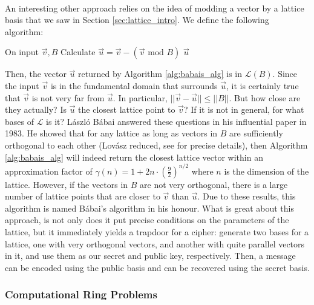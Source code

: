 \documentclass{article}
\theoremstyle{definition}
\theoremstyle{example}
\renewcommand{\L}{\mathcal{L}}
\renewcommand{\mod}{\,\,\text{mod}\,\,}
\newcommand{\norm}[1]{||#1||}
\begin{document}
\paragraph{} An interesting other approach relies on the idea of modding a
vector by a lattice basis that we saw in Section \ref{sec:lattice_intro}. We define the
following algorithm:
\begin{algorithm}[H]
  \caption{}
  \label{alg:babais_alg}
  \begin{algorithmic}
    \State On input $\vec{v}, B$
    \State Calculate $\vec{u} = \vec{v} - (\vec{v} \mod B)$
    \State \Return $\vec{u}$
  \end{algorithmic}
\end{algorithm}
Then, the vector $\vec{u}$ returned by Algorithm \ref{alg:babais_alg} is in $\L(B)$. Since
the input $\vec{v}$ is in the fundamental domain that surrounds $\vec{u}$, it is
certainly true that $\vec{v}$ is not very far from $\vec{u}$. In particular,
$\norm{\vec{v} - \vec{u}} \leq \norm{B}$. But how close are they actually? Is
$\vec{u}$ the closest lattice point to $\vec{v}$? If it is not in general, for
what bases of $\L$ is it? L\'aszl\'o B\'abai answered these questions in his
influential paper \cite{Babai1986} in 1983. He showed that for any lattice as long as vectors in $B$ are sufficiently
orthogonal to each other (Lov\'asz reduced, see \cite{lenstra1982factoring} for
precise details), then Algorithm \ref{alg:babais_alg} will indeed return the closest lattice
vector within an approximation factor of $\gamma(n) = 1 + 2n \cdot
(\frac92)^{n/2}$ where $n$ is the dimension of the lattice. However, if the
vectors in $B$ are not very orthogonal, there is a large number of lattice points that
are closer to $\vec{v}$ than $\vec{u}$. Due to these results, this algorithm is
named B\'abai's algorithm in his honour. What is great about this approach, is
not only does it put precise conditions on the parameters of the lattice, but it
immediately yields a trapdoor for a cipher: generate two bases for a lattice,
one with very orthogonal vectors, and another with quite parallel vectors in it,
and use them as our secret and public key, respectively. Then, a message can be
encoded using the public basis and can be recovered using the secret basis.
\subsubsection{Computational Ring Problems}
\end{document}

